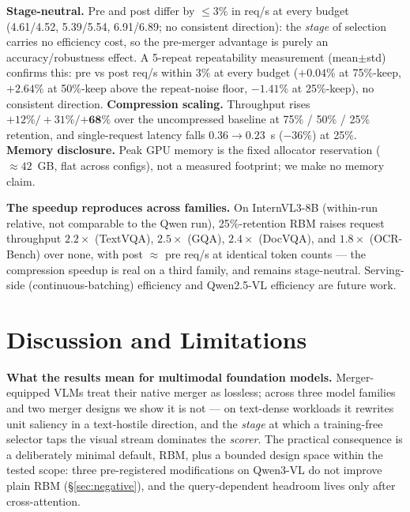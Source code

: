 \documentclass[sigconf,review,anonymous]{acmart}
\begin{document}
\textbf{Stage-neutral.} Pre and post differ by $\leq 3\%$ in req/s at every
budget (4.61/4.52, 5.39/5.54, 6.91/6.89; no consistent direction): the
\emph{stage} of selection carries no efficiency cost, so the pre-merger
advantage is purely an accuracy/robustness effect. A 5-repeat repeatability
measurement (mean$\pm$std) confirms this: pre vs post req/s within $3\%$ at every
budget ($+0.04\%$ at 75\%-keep, $+2.64\%$ at 50\%-keep above the repeat-noise
floor, $-1.41\%$ at 25\%-keep), no consistent direction. \textbf{Compression scaling.}
Throughput rises $+12\% / +31\% / \mathbf{+68\%}$ over the uncompressed baseline
at 75\% / 50\% / 25\% retention, and single-request latency falls
$0.36 \to 0.23$~s ($-36\%$) at 25\%. \textbf{Memory disclosure.} Peak GPU memory
is the fixed allocator reservation ($\approx 42$~GB, flat across configs), not a
measured footprint; we make no memory claim.

\textbf{The speedup reproduces across families.} On InternVL3-8B (within-run
relative, not comparable to the Qwen run), 25\%-retention RBM raises request
throughput $2.2\times$ (TextVQA), $2.5\times$ (GQA), $2.4\times$ (DocVQA), and
$1.8\times$ (OCR-Bench) over none, with post $\approx$ pre req/s at identical
token counts --- the compression speedup is real on a third family, and remains
stage-neutral. Serving-side (continuous-batching) efficiency and Qwen2.5-VL
efficiency are future work.

\section{Discussion and Limitations}\label{sec:discussion}

\textbf{What the results mean for multimodal foundation models.} Merger-equipped
VLMs treat their native merger as lossless; across three model families and two
merger designs we show it is not --- on text-dense workloads it rewrites unit
saliency in a text-hostile direction, and the \emph{stage} at which a
training-free selector taps the visual stream dominates the \emph{scorer}. The
practical consequence is a deliberately minimal default, RBM, plus a bounded
design space within the tested scope: three pre-registered modifications on
Qwen3-VL do not improve plain RBM (\S\ref{sec:negative}), and the query-dependent
headroom lives only after cross-attention.
\end{document}
